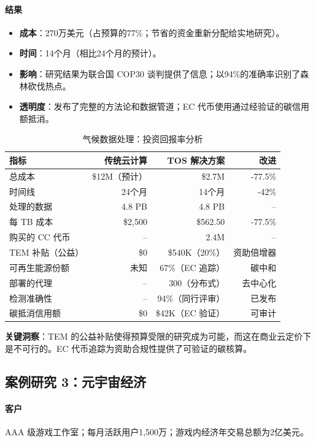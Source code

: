 \documentclass[11pt]{article}
\begin{document}
\paragraph{结果}
\begin{itemize}[noitemsep]
  \item \textbf{成本}：270万美元（占预算的77\%；节省的资金重新分配给实地研究）。
  \item \textbf{时间}：14个月（相比24个月的预计）。
  \item \textbf{影响}：研究结果为联合国 COP30 谈判提供了信息；以94\%的准确率识别了森林砍伐热点。
  \item \textbf{透明度}：发布了完整的方法论和数据管道；EC 代币使用通过经验证的碳信用额抵消。
\end{itemize}

\begin{table}[H]
\centering
\caption{气候数据处理：投资回报率分析}
\label{tab:climate-roi}
\begin{tabular}{@{}lrrr@{}}
\toprule
\textbf{指标} & \textbf{传统云计算} & \textbf{TOS 解决方案} & \textbf{改进} \\ \midrule
总成本 & \$12M（预计） & \$2.7M & -77.5\% \\
时间线 & 24个月 & 14个月 & -42\% \\
处理的数据 & 4.8 PB & 4.8 PB & -- \\
每 TB 成本 & \$2,500 & \$562.50 & -77.5\% \\
购买的 CC 代币 & -- & 2.4M & -- \\
TEM 补贴（公益） & \$0 & \$540K（20\%） & 资助倍增器 \\
可再生能源份额 & 未知 & 67\%（EC 追踪） & 碳中和 \\
部署的代理 & -- & 300（分布式） & 去中心化 \\
检测准确性 & -- & 94\%（同行评审） & 已发布 \\
碳抵消信用额 & \$0 & \$42K（EC 验证） & 可审计 \\
\bottomrule
\end{tabular}
\end{table}

\textbf{关键洞察}：TEM 的公益补贴使得预算受限的研究成为可能，而这在商业云定价下是不可行的。EC 代币追踪为资助合规性提供了可验证的碳核算。

\subsection{案例研究 3：元宇宙经济}

\paragraph{客户} AAA 级游戏工作室；每月活跃用户1,500万；游戏内经济年交易总额为2亿美元。
\end{document}

